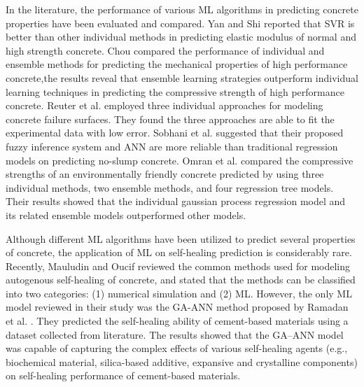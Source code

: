 \documentclass[11pt]{article}
\begin{document}
	In the literature, the performance of various ML algorithms in predicting concrete properties have been evaluated and compared. Yan and Shi \cite{yan2010prediction} reported that SVR is better than other individual methods in predicting elastic modulus of normal and high strength concrete. Chou \cite{chou2014machine} compared the performance of individual and ensemble methods for predicting the mechanical properties of high performance concrete,the results reveal that ensemble learning strategies outperform individual learning techniques in predicting the compressive strength of high performance concrete. Reuter et al. \cite{reuter2018comparative} employed three individual approaches for modeling concrete failure surfaces. They found the three approaches are able to fit the experimental data with low error. Sobhani et al. \cite{sobhani2010prediction} suggested that their  proposed fuzzy inference system and ANN are more reliable than traditional regression models on predicting no-slump concrete. Omran et al. \cite{omran2016comparison} compared the compressive strengths of an environmentally friendly concrete predicted by using three individual methods, two ensemble methods, and four regression tree models. Their results showed that the individual gaussian process regression model and its related ensemble models outperformed other models.
	

    Although different ML algorithms have been utilized to predict several properties of concrete, the application of ML on self-healing prediction is considerably rare. Recently, Mauludin and Oucif \cite{mauludin2019modeling} reviewed the common methods used for modeling autogenous self-healing of concrete, and stated that the methods can be classified into two categories: (1) numerical simulation and (2) ML. However, the only ML model reviewed in their study was the GA-ANN method proposed by Ramadan et al. \cite{ramadan2017modeling}. They predicted the self-healing ability of cement-based materials using a dataset collected from literature. The results showed that the  GA–ANN model was capable of capturing the complex effects of various self-healing agents (e.g., biochemical material, silica-based additive, expansive and crystalline components) on self-healing performance of cement-based materials. 
	
	
\end{document}
